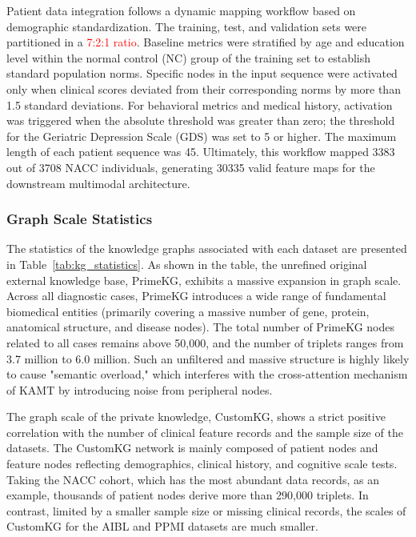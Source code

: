 \documentclass[lettersize,journal]{IEEEtran}
\begin{document}
Patient data integration follows a dynamic mapping workflow based on demographic standardization. The training, test, and validation sets were partitioned in a \textcolor{red}{7:2:1 ratio}. Baseline metrics were stratified by age and education level within the normal control (NC) group of the training set to establish standard population norms. Specific nodes in the input sequence were activated only when clinical scores deviated from their corresponding norms by more than 1.5 standard deviations. For behavioral metrics and medical history, activation was triggered when the absolute threshold was greater than zero; the threshold for the Geriatric Depression Scale (GDS) was set to 5 or higher. The maximum length of each patient sequence was 45. Ultimately, this workflow mapped 3383 out of 3708 NACC individuals, generating 30335 valid feature maps for the downstream multimodal architecture.

\subsubsection{Graph Scale Statistics}
The statistics of the knowledge graphs associated with each dataset are presented in Table~\ref{tab:kg_statistics}. As shown in the table, the unrefined original external knowledge base, PrimeKG, exhibits a massive expansion in graph scale. Across all diagnostic cases, PrimeKG introduces a wide range of fundamental biomedical entities (primarily covering a massive number of gene, protein, anatomical structure, and disease nodes). The total number of PrimeKG nodes related to all cases remains above 50,000, and the number of triplets ranges from 3.7 million to 6.0 million. Such an unfiltered and massive structure is highly likely to cause "semantic overload," which interferes with the cross-attention mechanism of KAMT by introducing noise from peripheral nodes.

The graph scale of the private knowledge, CustomKG, shows a strict positive correlation with the number of clinical feature records and the sample size of the datasets. The CustomKG network is mainly composed of patient nodes and feature nodes reflecting demographics, clinical history, and cognitive scale tests. Taking the NACC cohort, which has the most abundant data records, as an example, thousands of patient nodes derive more than 290,000 triplets. In contrast, limited by a smaller sample size or missing clinical records, the scales of CustomKG for the AIBL and PPMI datasets are much smaller.
\end{document}
